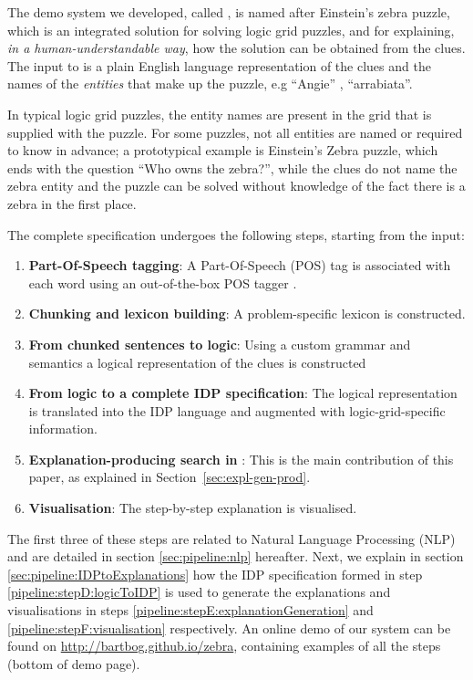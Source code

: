 The demo system we developed, called \ourtool, is named after Einstein's zebra puzzle, which is an integrated solution for solving logic grid puzzles, and for explaining, \textit{in a human-understandable way}, how the solution can be obtained from the clues. 
The input to \ourtool is a plain English language representation of the clues and the names of the \textit{entities} that make up the puzzle, e.g  ``Angie'' , ``arrabiata''. 

In typical logic grid puzzles, the entity names are present in the grid that is supplied with the puzzle. For some puzzles, not all entities are named or required to know in advance; a prototypical example is Einstein's Zebra puzzle, which ends with the question ``Who owns the zebra?'', while the clues do not name the zebra entity and the puzzle can be solved without knowledge of the fact there is a zebra in the first place.

The complete specification undergoes the following steps, starting from the input:

\begin{enumerate}[label=\textbf{\Alph*},ref={Step~\Alph*}]
	\item \label{pipeline:stepA:POS} \textbf{Part-Of-Speech tagging}: A Part-Of-Speech (POS) tag is associated with each word using an out-of-the-box POS tagger \cite{DBLP:journals/coling/MarcusSM94}.
	\item \label{pipeline:stepB:chukingLexicon} \textbf{Chunking and lexicon building}: A problem-specific lexicon is constructed.
	\item \label{pipeline:stepC:ChunkedToLogic} \textbf{From chunked sentences to logic}: Using a custom grammar and semantics a logical representation of the clues is constructed
	\item \label{pipeline:stepD:logicToIDP} \textbf{From logic to a complete IDP specification}: The logical representation is translated into the IDP language and augmented with logic-grid-specific information.
	\item \label{pipeline:stepE:explanationGeneration} \textbf{Explanation-producing search in \idp}: This is the main contribution of this paper, as explained in Section~\ref{sec:expl-gen-prod}.
	\item \label{pipeline:stepF:visualisation} \textbf{Visualisation}: The step-by-step explanation is visualised. 
\end{enumerate}

The first three of these steps are related to Natural Language Processing (NLP) and are detailed in section \ref{sec:pipeline:nlp} hereafter. 
Next, we explain in section \ref{sec:pipeline:IDPtoExplanations} how the IDP specification formed in step \ref{pipeline:stepD:logicToIDP} is used to generate the explanations and visualisations in steps \ref{pipeline:stepE:explanationGeneration} and \ref{pipeline:stepF:visualisation} respectively.
An online demo of our system can be found on \url{http://bartbog.github.io/zebra}, containing examples of all the steps (bottom of demo page). 

